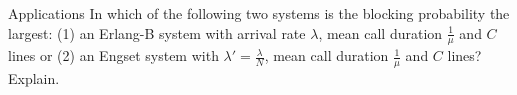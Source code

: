 \begin{problem}{Applications}
   In which of the following two systems is the blocking probability the largest: (1) an Erlang-B system with arrival rate $\lambda$, mean call duration $\frac{1}{\mu}$ and $C$ lines or (2) an Engset system with $\lambda' = \frac{\lambda}{N}$, mean call duration $\frac{1}{\mu}$ and $C$ lines? Explain.
\end{problem}
